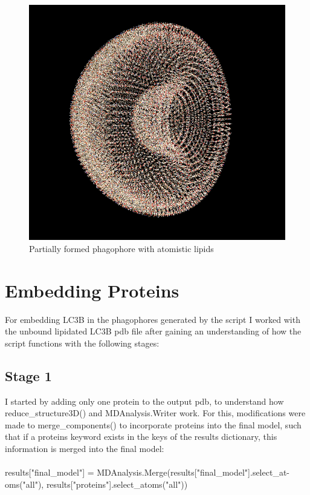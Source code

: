 \documentclass[12pt, a4paper]{report}
\begin{document}
\begin{figure}[h]
    \includegraphics[scale=0.8]{images/half phagophore.png} 
    \centering 
    \caption{Partially formed phagophore with atomistic lipids}
    \centering
\end{figure} 

\clearpage
\newpage 
\section*{Embedding Proteins} 

For embedding LC3B in the phagophores generated by the script I worked with the unbound lipidated LC3B pdb file after gaining an understanding of how the script functions with the following stages: 

\subsection*{Stage 1} 

I started by adding only one protein to the output pdb, to understand how reduce\_structure3D() and MDAnalysis.Writer work. For this, modifications were made to merge\_components() to incorporate proteins into the final model, such that if a proteins keyword exists in the keys of the results dictionary, this information is merged into the final model: 
\\~\\
results["final\_model"] = MDAnalysis.Merge(results["final\_model"].select\_at-
\\oms("all"), results["proteins"].select\_atoms("all")) 
\\~\\ 
\end{document}
